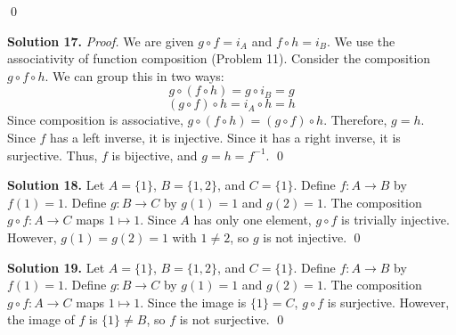 \documentclass[11pt, letterpaper]{article}
\theoremstyle{definition}
\theoremstyle{remark}
\begin{document}
\begin{center}
\end{center}
\qed

\textbf{Solution 17.}
\textit{Proof.} We are given $g \circ f = i_A$ and $f \circ h = i_B$. We use the associativity of function composition (Problem 11).
Consider the composition $g \circ f \circ h$. We can group this in two ways:
\[
g \circ (f \circ h) = g \circ i_B = g
\]
\[
(g \circ f) \circ h = i_A \circ h = h
\]
Since composition is associative, $g \circ (f \circ h) = (g \circ f) \circ h$. Therefore, $g = h$. 
Since $f$ has a left inverse, it is injective. Since it has a right inverse, it is surjective. Thus, $f$ is bijective, and $g = h = f^{-1}$.
\qed

\textbf{Solution 18.}
Let $A = \{1\}$, $B = \{1, 2\}$, and $C = \{1\}$. 
Define $f: A \to B$ by $f(1) = 1$. 
Define $g: B \to C$ by $g(1) = 1$ and $g(2) = 1$. 
The composition $g \circ f: A \to C$ maps $1 \mapsto 1$. Since $A$ has only one element, $g \circ f$ is trivially injective. 
However, $g(1) = g(2) = 1$ with $1 \neq 2$, so $g$ is not injective.
\qed

\textbf{Solution 19.}
Let $A = \{1\}$, $B = \{1, 2\}$, and $C = \{1\}$. 
Define $f: A \to B$ by $f(1) = 1$. 
Define $g: B \to C$ by $g(1) = 1$ and $g(2) = 1$. 
The composition $g \circ f: A \to C$ maps $1 \mapsto 1$. Since the image is $\{1\} = C$, $g \circ f$ is surjective. 
However, the image of $f$ is $\{1\} \neq B$, so $f$ is not surjective.
\qed
\end{document}
